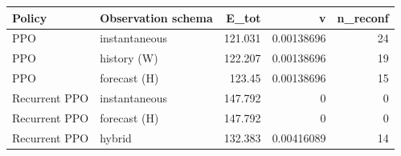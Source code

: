 \begin{tabular}{llrrr}
\toprule
Policy & Observation schema & E_tot & v & n_reconf \\
\midrule
PPO & instantaneous & 121.031 & 0.00138696 & 24 \\
PPO & history (W) & 122.207 & 0.00138696 & 19 \\
PPO & forecast (H) & 123.45 & 0.00138696 & 15 \\
Recurrent PPO & instantaneous & 147.792 & 0 & 0 \\
Recurrent PPO & forecast (H) & 147.792 & 0 & 0 \\
Recurrent PPO & hybrid & 132.383 & 0.00416089 & 14 \\
\bottomrule
\end{tabular}
